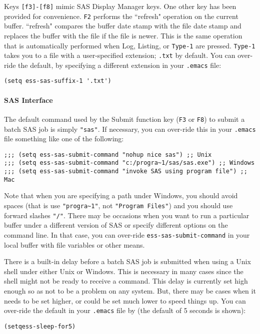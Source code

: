 \documentclass{article}
\newenvironment{Salltt}{\small\begin{alltt}}{\end{alltt}}
\begin{document}
Keys \texttt{[f3]-[f8]} mimic SAS Display Manager keys.  One other key has been
provided for convenience.  \texttt{F2} performs the ``refresh" operation on the
current buffer.  ``refresh" compares the buffer date stamp with the
file date stamp and replaces the buffer with the file if the file is
newer.  This is the same operation that is automatically performed
when Log, Listing, or \texttt{Type-1} are pressed.  \texttt{Type-1} takes you to a file
with a user-specified extension; \texttt{.txt} by default.  You can over-ride
the default, by specifying a different extension in your \texttt{.emacs} file:
\begin{verbatim}
(setq ess-sas-suffix-1 '.txt')
\end{verbatim}

\paragraph{SAS Interface}
\label{sec:SAS:interface}

The default command used by the Submit function key (\texttt{F3} or \texttt{F8}) to
submit a batch SAS job is simply \texttt{"sas"}.  If necessary, you can
over-ride this in your \verb+.emacs+ file something like one of the
following:
{\small
\begin{verbatim}
;;; (setq ess-sas-submit-command "nohup nice sas") ;; Unix
;;; (setq ess-sas-submit-command "c:/progra~1/sas/sas.exe") ;; Windows
;;; (setq ess-sas-submit-command "invoke SAS using program file") ;; Mac
\end{verbatim}
}
Note that when you are specifying a path under Windows, you should
avoid spaces (that is use {\verb+"progra~1"+}, not \texttt{"Program Files"}) and you
should use forward slashes \texttt{"/"}.  There may be occasions when you want
to run a particular buffer under a different version of SAS or specify
different options on the command line.  In that case, you can
over-ride \texttt{ess-sas-submit-command} in your local buffer with file
variables or other means.

There is a built-in delay before a batch SAS job is submitted when using
a Unix shell under either Unix or Windows.  This is necessary in many cases 
since the shell might not be ready to receive a command.  This delay is 
currently set high enough so as not to be a problem on any system.  But,
there may be cases when it needs to be set higher, or could be set much
lower to speed things up.  You can over-ride the default in your \texttt{.emacs}
file by (the default of 5 seconds is shown):
\begin{Salltt}
(setq ess-sleep-for 5)
\end{Salltt}
\end{document}
